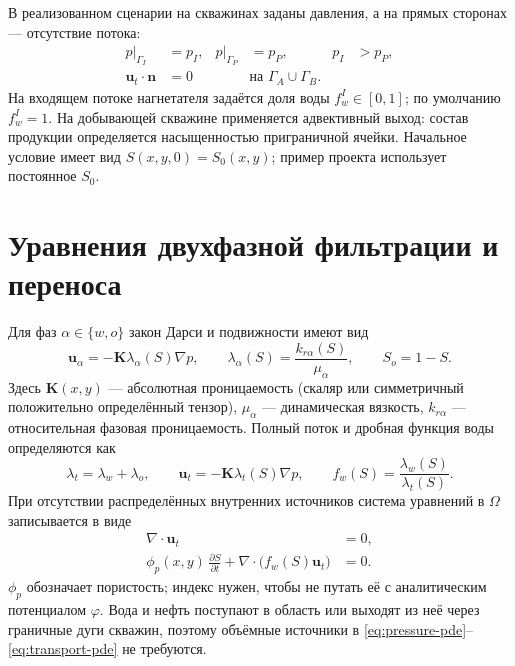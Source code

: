 \documentclass[12pt,a4paper]{article}
\begin{document}
В реализованном сценарии на скважинах заданы давления, а на прямых сторонах
--- отсутствие потока:
\begin{align}
 p|_{\Gamma_I}&=p_I, & p|_{\Gamma_P}&=p_P, & p_I&>p_P,\label{eq:bc-pressure}\\
 \mathbf u_t\cdot\mathbf n&=0 &&\text{на }\Gamma_A\cup\Gamma_B.
 \label{eq:bc-noflow}
\end{align}
На входящем потоке нагнетателя задаётся доля воды $f_w^I\in[0,1]$;
по умолчанию $f_w^I=1$. На добывающей скважине применяется адвективный
выход: состав продукции определяется насыщенностью приграничной ячейки.
Начальное условие имеет вид $S(x,y,0)=S_0(x,y)$; пример проекта использует
постоянное $S_0$.

\section{Уравнения двухфазной фильтрации и переноса}

Для фаз $\alpha\in\{w,o\}$ закон Дарси и подвижности имеют вид
\begin{equation}
 \mathbf u_\alpha=-\mathbf K\lambda_\alpha(S)\nabla p,
 \qquad
 \lambda_\alpha(S)=\frac{k_{r\alpha}(S)}{\mu_\alpha},
 \qquad S_o=1-S.
 \label{eq:darcy}
\end{equation}
Здесь $\mathbf K(x,y)$ --- абсолютная проницаемость (скаляр или симметричный
положительно определённый тензор), $\mu_\alpha$ --- динамическая вязкость,
$k_{r\alpha}$ --- относительная фазовая проницаемость. Полный поток и
дробная функция воды определяются как
\begin{equation}
 \lambda_t=\lambda_w+\lambda_o,\qquad
 \mathbf u_t=-\mathbf K\lambda_t(S)\nabla p,\qquad
 f_w(S)=\frac{\lambda_w(S)}{\lambda_t(S)}.
 \label{eq:total-flux}
\end{equation}
При отсутствии распределённых внутренних источников система уравнений в
$\Omega$ записывается в виде
\begin{align}
 \nabla\cdot\mathbf u_t&=0,
 \label{eq:pressure-pde}\\
 \phi_p(x,y)\,\frac{\partial S}{\partial t}
 +\nabla\cdot\bigl(f_w(S)\mathbf u_t\bigr)&=0.
 \label{eq:transport-pde}
\end{align}
$\phi_p$ обозначает пористость; индекс нужен, чтобы не путать её с
аналитическим потенциалом $\varphi$. Вода и нефть поступают в область или
выходят из неё через граничные дуги скважин, поэтому объёмные источники в
\eqref{eq:pressure-pde}--\eqref{eq:transport-pde} не требуются.
\end{document}
